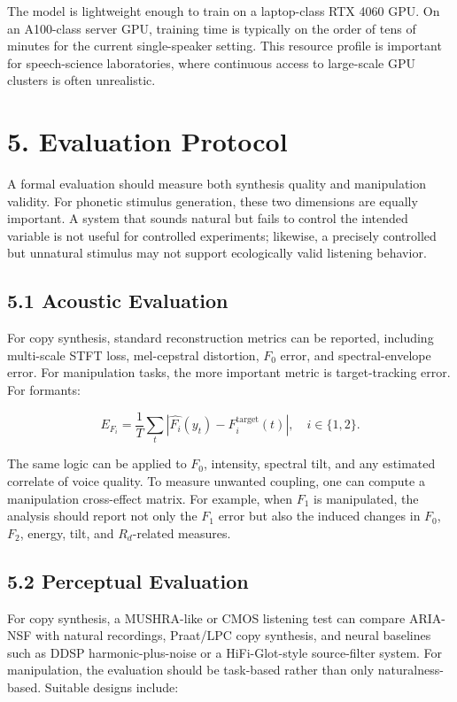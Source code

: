\documentclass[
  10pt,
]{article}
\begin{document}
The model is lightweight enough to train on a laptop-class RTX 4060 GPU.
On an A100-class server GPU, training time is typically on the order of
tens of minutes for the current single-speaker setting. This resource
profile is important for speech-science laboratories, where continuous
access to large-scale GPU clusters is often unrealistic.

\section{5. Evaluation Protocol}\label{evaluation-protocol}

A formal evaluation should measure both synthesis quality and
manipulation validity. For phonetic stimulus generation, these two
dimensions are equally important. A system that sounds natural but fails
to control the intended variable is not useful for controlled
experiments; likewise, a precisely controlled but unnatural stimulus may
not support ecologically valid listening behavior.

\subsection{5.1 Acoustic Evaluation}\label{acoustic-evaluation}

For copy synthesis, standard reconstruction metrics can be reported,
including multi-scale STFT loss, mel-cepstral distortion, \(F_0\) error,
and spectral-envelope error. For manipulation tasks, the more important
metric is target-tracking error. For formants:

\[
E_{F_i}
=
\frac{1}{T}
\sum_t
\left|
\widehat{F_i}(y_t)-F_i^{\mathrm{target}}(t)
\right|,
\quad i\in\{1,2\}.
\]

The same logic can be applied to \(F_0\), intensity, spectral tilt, and
any estimated correlate of voice quality. To measure unwanted coupling,
one can compute a manipulation cross-effect matrix. For example, when
\(F_1\) is manipulated, the analysis should report not only the \(F_1\)
error but also the induced changes in \(F_0\), \(F_2\), energy, tilt,
and \(R_d\)-related measures.

\subsection{5.2 Perceptual Evaluation}\label{perceptual-evaluation}

For copy synthesis, a MUSHRA-like or CMOS listening test can compare
ARIA-NSF with natural recordings, Praat/LPC copy synthesis, and neural
baselines such as DDSP harmonic-plus-noise or a HiFi-Glot-style
source-filter system. For manipulation, the evaluation should be
task-based rather than only naturalness-based. Suitable designs include:
\end{document}
